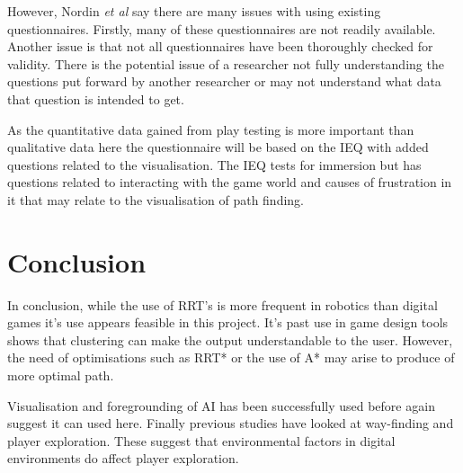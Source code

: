 \documentclass[journal]{IEEEtran}
\begin{document}
However, Nordin \textit{et al} say there are many issues with using existing questionnaires. Firstly, many of these questionnaires are not readily available. Another issue is that not all questionnaires have been thoroughly checked for validity. There is the potential issue of a researcher not fully understanding the questions put forward by another researcher or may not understand what data that question is intended to get.

As the quantitative data gained from play testing is more important than qualitative data here the questionnaire will be based on the IEQ with added questions related to the visualisation. The IEQ tests for immersion but has questions related to interacting with the game world and causes of frustration in it that may relate to the visualisation of path finding.



\section{Conclusion}
In conclusion, while the use of RRT's is more frequent in robotics than digital games it's use appears feasible in this project. It's past use in game design tools shows that clustering can make the output understandable to the user. However,  the need of optimisations  such as RRT* or the use of A* may arise to produce of more optimal path. 

Visualisation and foregrounding of AI has been successfully used before again suggest it can used here. Finally previous studies have looked at way-finding and player exploration. These suggest that environmental factors in digital environments do affect player exploration.






\end{document}
